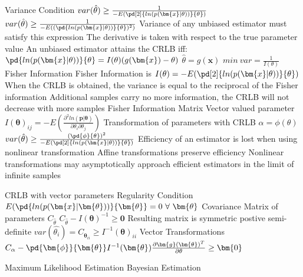 \documentclass[14pt]{extarticle}
\begin{document}
\begin{outline}
				\3	Variance Condition
					\4	$var(\hat{\theta}) \ge \frac{1}{-E( \pd[2]{ln(p(\bm{x} | \theta))}{\theta})}$
					\4	$var(\hat{\theta}) \ge \frac{1}{-E( (\pd{ln(p(\bm{x} | \theta))}{\theta})^2)}$	
					\4	Variance of any unbiased estimator must satisfy this expression
					\4	The derivative is taken with respect to the true parameter value
				\3	An unbiased estimator attains the CRLB iff:
					\4	$\pd{ln(p(\bm{x} | \theta))}{\theta} = I(\theta)(g(\bm{x}) - \theta)$
					\4	$\hat{\theta} = g(\bm{x})$
					\4	$min~var = \frac{1}{I(\theta)}$
			\2	Fisher Information
				\3	Fisher Information is $I(\theta) = -E( \pd[2]{ln(p(\bm{x} | \theta))}{\theta})$
				\3	When the CRLB is obtained, the variance is equal to the reciprocal of the 
						Fisher information
				\3	Additional samples carry no more information, the CRLB will not
						decrease with more samples
				\3	Fisher Information Matrix
					\4	Vector valued parameter
					\4	$I(\bm{\theta})_{ij} = -E(\frac{\partial^2ln(\bm{p} | \bm{\theta})}
																								{\partial \theta_i \partial \theta_j})$
			\2	Transformation of parameters with CRLB
				\3	$\alpha = \phi(\theta)$
				\3	$var(\hat{\theta}) \ge \frac{(\pd{\phi}{\theta})^2}{-E( \pd[2]{ln(p(\bm{x} | \theta))}{\theta})}$
				\3	Efficiency of an estimator is lost when using nonlinear transformation
				\3	Affine transformations preserve efficiency
				\3	Nonlinear transformations may asymptotically approach efficient estimators
						in the limit of infinite samples
			
			\2	CRLB with vector parameters
				\3	Regularity Condition
					\4	$E(\pd{ln(p(\bm{x} | \bm{\theta}))}{\bm{\theta}} = 0~\forall~\bm{\theta}$
				\3	Covariance Matrix of parameters $C_{\hat{\theta}}$
				\3	$C_{\hat{\theta}} - I(\bm{\theta})^{-1} \ge \bm{0}$
					\4	Resulting matrix is symmetric postive semi-definite
				\3	$var(\hat{\theta_i}) = C_{\bm{\hat{\theta}}}_{ii} \ge I^{-1}(\bm{\theta})_{ii}$
				\3	Vector Transformations
					\4	$C_{\alpha} - \pd{\bm{\phi}}{\bm{\theta}}I^{-1}(\bm{\theta})
							\frac{\partial \bm{g}(\bm{\theta})^T}{\partial \theta} \ge \bm{0}$

		\1	Maximum Likelihood Estimation	%
		\1	Bayesian Estimation %
	\end{outline}
\end{document}
